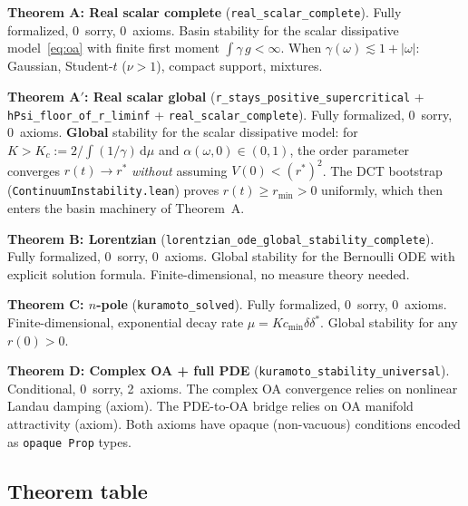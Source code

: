\documentclass[11pt,a4paper]{article}
\theoremstyle{definition}
\begin{document}
\medskip
\noindent\textbf{Theorem A: Real scalar complete} (\texttt{real\_scalar\_complete}). Fully formalized, 0~sorry, 0~axioms. Basin stability for the scalar dissipative model~\eqref{eq:oa} with finite first moment $\int \gamma\,g < \infty$. When $\gamma(\omega) \lesssim 1 + |\omega|$: Gaussian, Student-$t$ ($\nu > 1$), compact support, mixtures.

\medskip
\noindent\textbf{Theorem A$'$: Real scalar global} (\texttt{r\_stays\_positive\_supercritical} + \texttt{hPsi\_floor\_of\_r\_liminf} + \texttt{real\_scalar\_complete}). Fully formalized, 0~sorry, 0~axioms. \textbf{Global} stability for the scalar dissipative model: for $K > K_c := 2/\int(1/\gamma)\,\mathrm{d}\mu$ and $\alpha(\omega,0) \in (0,1)$, the order parameter converges $r(t) \to r^*$ \emph{without} assuming $V(0) < (r^*)^2$. The DCT bootstrap (\texttt{ContinuumInstability.lean}) proves $r(t) \geq r_{\min} > 0$ uniformly, which then enters the basin machinery of Theorem~A.

\medskip
\noindent\textbf{Theorem B: Lorentzian} (\texttt{lorentzian\_ode\_global\_stability\_complete}). Fully formalized, 0~sorry, 0~axioms. Global stability for the Bernoulli ODE with explicit solution formula. Finite-dimensional, no measure theory needed.

\medskip
\noindent\textbf{Theorem C: $n$-pole} (\texttt{kuramoto\_solved}). Fully formalized, 0~sorry, 0~axioms. Finite-dimensional, exponential decay rate $\mu = K c_{\min}\delta\delta^*$. Global stability for any $r(0) > 0$.

\medskip
\noindent\textbf{Theorem D: Complex OA + full PDE} (\texttt{kuramoto\_stability\_universal}). Conditional, 0~sorry, 2~axioms. The complex OA convergence relies on nonlinear Landau damping \cite{dietert2017} (axiom). The PDE-to-OA bridge relies on OA manifold attractivity \cite{dietert-fernandez2018} (axiom). Both axioms have opaque (non-vacuous) conditions encoded as \texttt{opaque Prop} types.

\subsection{Theorem table}
\end{document}
